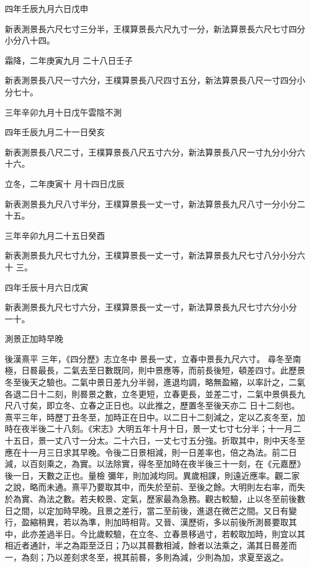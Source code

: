 \begin{pinyinscope}
 四年壬辰九月六日戊申



 新表測景長六尺七寸三分半，王樸算景長六尺九寸一分，新法算景長六尺七寸四分小分八十四。



 霜降，二年庚寅九月
 二十八日壬子



 新表測景長八尺一寸六分，王樸算景長八尺四寸五分，新法算景長八尺一寸四分小分七十。



 三年辛卯九月十日戊午雲陰不測



 四年壬辰九月二十一日癸亥



 新表測景長八尺二寸，王樸算景長八尺五寸六分，新法算景長八尺一寸九分小分六十六。



 立冬，二年庚寅十
 月十四日戊辰



 新表測景長九尺八寸半分，王樸算景長一丈一寸，新法算景長九尺八寸一分小分二十五。



 三年辛卯九月二十五日癸酉



 新表測景長九尺七寸九分，王樸算景長一丈一寸，新法算景長九尺七寸八分小分六十
 三。



 四年壬辰十月六日戊寅



 新表測景長九尺七寸六分，王樸算景長一丈一寸，新法算景長九尺七寸六分小分
 一十。



 測景正加時早晚



 後漢熹平
 三年，《四分歷》志立冬中
 景長一丈，立春中景長九尺六寸。
 尋冬至南極，日晷最長，二氣去至日數既同，則中景應等，而前長後短，頓差四寸。此歷景冬至後天之驗也。二氣中景日差九分半弱，進退均調，略無盈縮，以率計之，二氣各退二日十二刻，則晷景之數，立冬更短，立春更長，並差二寸，二氣中景俱長九尺八寸矣，即立冬、立春之正日也。以此推之，歷置冬至後天亦二
 日十二刻也。熹平三年，時歷丁丑冬至，加時正在日中。以二日十二刻減之，定以乙亥冬至，加時在夜半後二十八刻。《宋志》大明五年十月十日，景一丈七寸七分半；十一月二十五日，景一丈八寸一分太。二十六日，一丈七寸五分強。折取其中，則中天冬至應在十一月三日求其早晚。令後二日景相減，則一日差率也，倍之為法。前二日減，以百刻乘之，為實。以法除實，得冬至加時在夜半後三十一刻，在《元嘉歷》後一日，天數之正也。量檢
 彌年，則加減均同。異歲相課，則遠近應率。觀二家之說，略而未通。熹平乃要取其中，而失於至前、至後之餘。大明則左右率，而失於為實、為法之數。若夫較景、定氣，歷家最為急務。觀古較驗，止以冬至前後數日之間，以定加時早晚。且景之差行，當二至前後，進退在微芒之間。又日有變行，盈縮稍異，若以為準，則加時相背。又晉、漢歷術，多以前後所測晷要取其中，此亦差過半日。今比歲較驗，在立冬、立春景移過寸，若較取加時，則宜以其
 相近者通計，半之為距至泛日；乃以其晷數相減，餘者以法乘之，滿其日晷差而一，為刻；乃以差刻求冬至，視其前晷，多則為減，少則為加，求夏至返之。




\end{pinyinscope}
